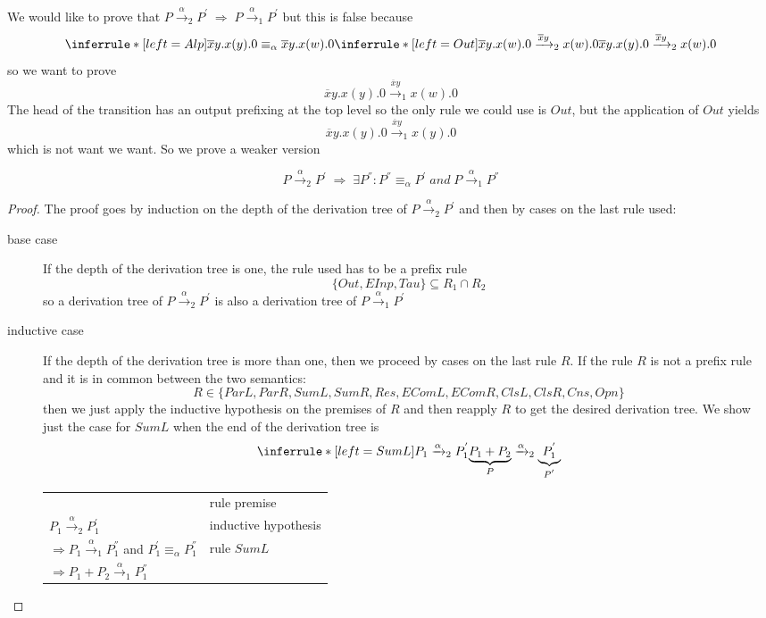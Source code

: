 We would like to prove that $P\xrightarrow{\alpha}_{2}P^{'}\; \Rightarrow\; P\xrightarrow{\alpha}_{1}P^{'}$ but this is false because
\[
  \inferrule* [left=Alp]{
      \overline{x}y.x(y).0 \equiv_{\alpha} \overline{x}y.x(w).0
    \\
      \inferrule* [left=Out]{
      }{
	\overline{x}y.x(w).0\xrightarrow{\overline{x}y}_{2}x(w).0
      }
  }{
    \overline{x}y.x(y).0\xrightarrow{\overline{x}y}_{2}x(w).0
  }
\]
so we want to prove 
\[
  \overline{x}y.x(y).0\xrightarrow{\overline{x}y}_{1}x(w).0
\] 
The head of the transition has an output prefixing at the top level so the only rule we could use is $Out$, but the application of $Out$ yields 
\[
  \overline{x}y.x(y).0\xrightarrow{\overline{x}y}_{1}x(y).0
\] 
which is not want we want. So we prove a weaker version
\begin{theorem}
\[
  P\xrightarrow{\alpha}_{2}P^{'}\; \Rightarrow\; \exists P^{''}: P^{''}\equiv_{\alpha}P^{'}\; and\; P\xrightarrow{\alpha}_{1}P^{''}
\]
  \begin{proof}
    The proof goes by induction on the depth of the derivation tree of $P\xrightarrow{\alpha}_{2}P^{'}$ and then by cases on the last rule used:
    \begin{description}
      \item[base case]
	If the depth of the derivation tree is one, the rule used has to be a prefix rule 
	\[
	  \{Out, EInp, Tau\}\subseteq R_{1}\cap R_{2}
	\]
	so a derivation tree of $P\xrightarrow{\alpha}_{2}P^{'}$ is also a derivation tree of $P\xrightarrow{\alpha}_{1}P^{'}$
      \item[inductive case]
	If the depth of the derivation tree is more than one, then we proceed by cases on the last rule $R$. If the rule $R$ is not a prefix rule and it is in common between the two semantics:
	\[
	  R\in \{ParL, ParR, SumL, SumR, Res, EComL, EComR, ClsL, ClsR, Cns, Opn\}
	\]
	then we just apply the inductive hypothesis on the premises of $R$ and then reapply $R$ to get the desired derivation tree. We show just the case for $SumL$ when the end of the derivation tree is 
	\[
	  \inferrule* [left=SumL]{
	    P_{1}\xrightarrow{\alpha}_{2}P_{1}^{'}
	  }{
	    \underbrace{P_{1}+P_{2}}_{P}\xrightarrow{\alpha}_{2}\underbrace{P_{1}^{'}}_{P^{'}}
	  }
	\]
	\begin{center}
	  \begin{tabular}{ll}
	    &rule premise\\
	    $P_{1}\xrightarrow{\alpha}_{2}P_{1}^{'}$&inductive hypothesis\\
	    $\Rightarrow  P_{1}\xrightarrow{\alpha}_{1}P_{1}^{''}$ and $P_{1}^{'}\equiv_{\alpha}P_{1}^{''}$&rule $SumL$\\
	    $\Rightarrow  P_{1}+P_{2}\xrightarrow{\alpha}_{1}P_{1}^{''}$&\\
	  \end{tabular}
	\end{center}
	

\end{description}
\end{proof}
\end{theorem}
